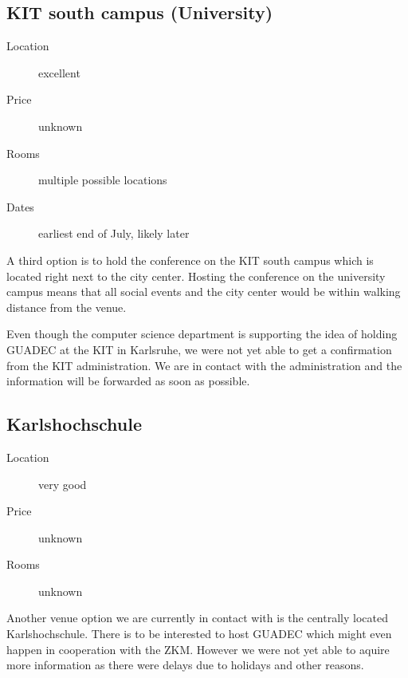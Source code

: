 \vspace*{6cm}

\subsection{KIT south campus (University)}%

\begin{description}
\item[Location] excellent
\item[Price] unknown
\item[Rooms] multiple possible locations
\item[Dates] earliest end of July, likely later
\end{description}

A third option is to hold the conference on the KIT south campus which is
located right next to the city center. Hosting the conference on the university
campus means that all social events and the city center would be within walking
distance from the venue.

Even though the computer science department is supporting the idea of holding
GUADEC at the KIT in Karlsruhe, we were not yet able to get a confirmation from
the KIT administration. We are in contact with the administration and the
information will be forwarded as soon as possible.

\subsection{Karlshochschule}
\begin{description}
\item[Location] very good
\item[Price] unknown
\item[Rooms] unknown
\end{description}

Another venue option we are currently in contact with is the centrally
located Karlshochschule. There is to be interested to host GUADEC which
might even happen in cooperation with the ZKM. However we were not yet able
to aquire more information as there were delays due to holidays and other reasons.

